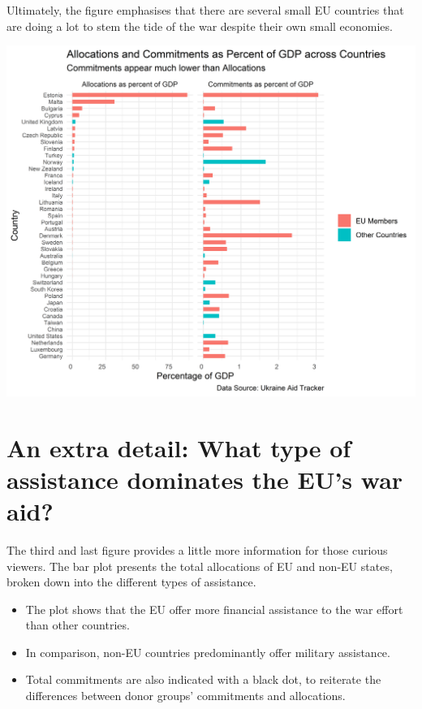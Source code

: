 \documentclass[11pt,preprint, authoryear]{elsarticle}
\let\origfigure\figure
\let\endorigfigure\endfigure
\renewenvironment{figure}[1][2] {
    \expandafter\origfigure\expandafter[H]
} {
    \endorigfigure
}
\numberwithin{equation}{section}
\numberwithin{figure}{section}
\numberwithin{table}{section}
\begin{document}
Ultimately, the figure emphasises that there are several small EU
countries that are doing a lot to stem the tide of the war despite their
own small economies.

\begin{figure}[H]

{\centering \includegraphics{Question_3_files/figure-latex/Figure2-1} 

}

\caption{Percent GDP \label{Figure2}}\label{fig:Figure2}
\end{figure}

\hypertarget{an-extra-detail-what-type-of-assistance-dominates-the-eus-war-aid}{%
\section{\texorpdfstring{An extra detail: What type of assistance
dominates the EU's war aid?
\label{aid_type}}{An extra detail: What type of assistance dominates the EU's war aid? }}\label{an-extra-detail-what-type-of-assistance-dominates-the-eus-war-aid}}

The third and last figure provides a little more information for those
curious viewers. The bar plot presents the total allocations of EU and
non-EU states, broken down into the different types of assistance.

\begin{itemize}
\item
  The plot shows that the EU offer more financial assistance to the war
  effort than other countries.
\item
  In comparison, non-EU countries predominantly offer military
  assistance.
\item
  Total commitments are also indicated with a black dot, to reiterate
  the differences between donor groups' commitments and allocations.
\end{itemize}
\end{document}
